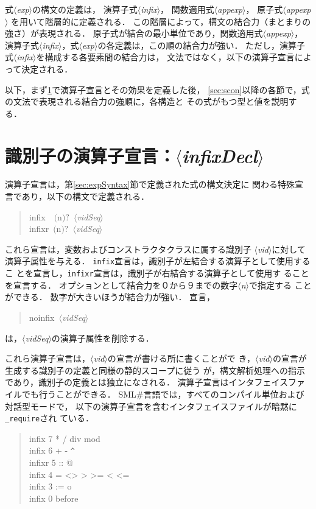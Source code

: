 \documentclass{jbook}
\newcommand{\smlsharp}{SML\#}
\newcommand{\code}[1]{\mbox{\large\tt #1}}
\newcommand{\nonterm}[1]{\mbox{$\langle$}{\it #1}\mbox{$\rangle$}}
\newcommand{\optional}[1]{\mbox{$($}{\protect #1}\mbox{$)?$}}
\newenvironment{program}{\begin{quote}\begin{tt}}%
                        {\end{tt}\end{quote}}
\begin{document}
	式\nonterm{exp}の構文の定義は，
演算子式\nonterm{infix}，
関数適用式\nonterm{appexp}，
原子式\nonterm{appexp}
を用いて階層的に定義される．
	この階層によって，構文の結合力（まとまりの強さ）が表現される．
	原子式が結合の最小単位であり，関数適用式\nonterm{appexp}，
演算子式\nonterm{infix}，式\nonterm{exp}の各定義は，この順の結合力が強い．
	ただし，演算子式\nonterm{infix}を構成する各要素間の結合力は，
文法ではなく，以下の演算子宣言によって決定される．

	以下，まず\ref{sec:infixDecl}で演算子宣言とその効果を定義した後，
\ref{sec:scon}以降の各節で，式の文法で表現される結合力の強順に，各構造と
その式がもつ型と値を説明する．

\section{識別子の演算子宣言：\nonterm{infixDecl}}
\label{sec:infixDecl}

	演算子宣言は，第\ref{sec:expSyntax}節で定義された式の構文決定に
関わる特殊宣言であり，以下の構文で定義される．
\begin{program}
infix\ \ \optional{n}\ \nonterm{vidSeq}\\
infixr\ \optional{n}\ \nonterm{vidSeq}
\end{program}
	これら宣言は，変数およびコンストラクタクラスに属する識別子
\nonterm{vid}に対して演算子属性を与える．
	\code{infix}宣言は，識別子が左結合する演算子として使用するこ
とを宣言し，\code{infixr}宣言は，識別子が右結合する演算子として使用す
ることを宣言する．
	オプションとして結合力を０から９までの数字\nonterm{n}で指定する
ことができる．
	数字が大きいほうが結合力が強い．
	宣言，
\begin{program}
noinfix\ \nonterm{vidSeq} 
\end{program}
は，\nonterm{vidSeq}の演算子属性を削除する．

	これら演算子宣言は，\nonterm{vid}の宣言が書ける所に書くことがで
き，\nonterm{vid}の宣言が生成する識別子の定義と同様の静的スコープに従う
が，構文解析処理への指示であり，識別子の定義とは独立になされる．
	演算子宣言はインタフェイスファイルでも行うことができる．
	\smlsharp{}言語では，すべてのコンパイル単位および対話型モードで，
以下の演算子宣言を含むインタフェイスファイルが暗黙に\code{\_require}され
ている．
\begin{program}
  infix  7 * / div mod\\
  infix  6 + - \verb|^|\\
  infixr 5 :: @\\
  infix  4 = <> > >= < <=\\
  infix  3 := o\\
  infix  0 before
\end{program}
	
\end{document}
